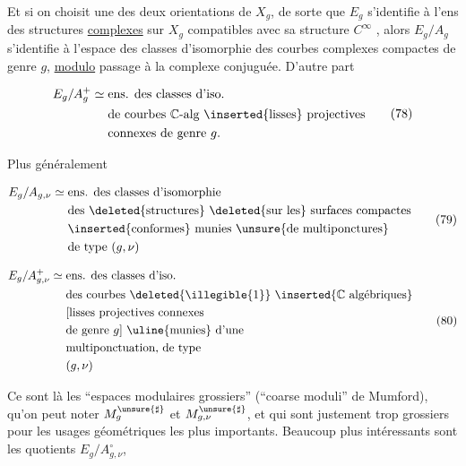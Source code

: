 Et si on choisit une des deux orientations de \(X_g\), de sorte que \(E_g\) s'identifie à l'ens des structures \uline{complexes} sur \(X_g\) compatibles avec sa structure \(C^\infty\) , alors \(E_g/A_g\) s'identifie à l'espace des classes d'isomorphie des courbes complexes  compactes de genre \(g\), \uline{modulo} passage à la complexe conjuguée. D'autre part


\[
 \begin{aligned}
 E_g/A_g^+\simeq{}&\text{ens. des classes d'iso.}\\
 &\text{de courbes }\mathbb C\text{-alg \inserted{lisses} projectives}\\
 &\text{connexes de genre }g.
 \end{aligned}
 \tag{78}
\]

Plus généralement

\[
 \begin{aligned}
 E_g/A_{g,\nu}\simeq{}&\text{ens. des classes d'isomorphie}\\
 &\text{des \deleted{structures} \deleted{sur les} surfaces compactes}\\
 &\text{\inserted{conformes} munies \unsure{de multiponctures}}\\
 &\text{de type }(g,\nu)
 \end{aligned}
 \tag{79}
\]

\[
 \begin{aligned}
 E_g/A_{g,\nu}^{+}\simeq{}&\text{ens. des classes d'iso.}\\
 &\text{des courbes \deleted{\illegible{1}} \inserted{\(\mathbb C\) algébriques}}\\
 &\text{[lisses projectives connexes}\\
 &\text{de genre }g\text{] \uline{munies} d'une}\\
 &\text{multiponctuation, de type}\\
 &(g,\nu)
 \end{aligned}
 \tag{80}
\]

Ce sont là les ``espaces modulaires grossiers'' (``coarse moduli'' de Mumford), qu'on peut noter \(M_g^{\unsure{\sharp}}\) et \(M_{g,\nu}^{\unsure{\sharp}}\), et qui sont justement trop grossiers pour les usages géométriques les plus importants.  Beaucoup plus intéressants sont les quotients \(E_g/A_{g,\nu}^{\circ}\), 


